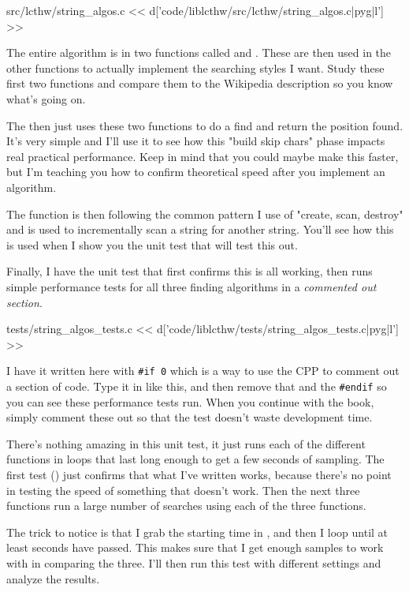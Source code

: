 \begin{code}{src/lcthw/string\_algos.c}
<< d['code/liblcthw/src/lcthw/string_algos.c|pyg|l'] >>
\end{code}

The entire algorithm is in two  functions called
 and .  These are
then used in the other functions to actually implement the searching styles I
want.  Study these first two functions and compare them to the Wikipedia
description so you know what's going on.

The  then just uses these two functions to do a find and
return the position found.  It's very simple and I'll use it to see how this
"build skip chars" phase impacts real practical performance.  Keep in mind that
you could maybe make this faster, but I'm teaching you how to confirm
theoretical speed after you implement an algorithm.

The  function is then following the common pattern I
use of "create, scan, destroy" and is used to incrementally scan a string for
another string.  You'll see how this is used when I show you the unit test that
will test this out.

Finally, I have the unit test that first confirms this is all working, then
runs simple performance tests for all three finding algorithms in a \emph{commented out section}.

\begin{code}{tests/string\_algos\_tests.c}
<< d['code/liblcthw/tests/string_algos_tests.c|pyg|l'] >>
\end{code}

I have it written here with \verb|#if 0| which is a way to use the CPP to 
comment out a section of code.  Type it in like this, and then remove that
and the \verb|#endif| so you can see these performance tests run.  When you
continue with the book, simply comment these out so that the test doesn't
waste development time.

There's nothing amazing in this unit test, it just runs each of the different
functions in loops that last long enough to get a few seconds of sampling.  The
first test () just confirms that what I've written
works, because there's no point in testing the speed of something that doesn't
work.  Then the next three functions run a large number of searches using each
of the three functions.

The trick to notice is that I grab the starting time in , and then
I loop until at least  seconds have passed.  This makes sure
that I get enough samples to work with in comparing the three.  I'll then run
this test with different  settings and analyze the results.

